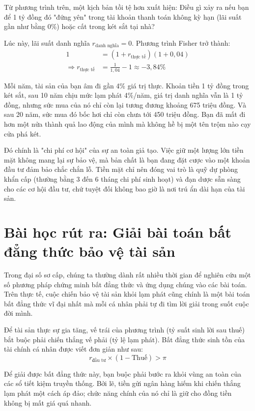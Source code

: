\documentclass[14pt, a4paper, oneside]{extreport}
\begin{document}
Từ phương trình trên, một kịch bản tồi tệ hơn xuất hiện: Điều gì xảy ra nếu bạn để 1 tỷ đồng đó "đứng yên" trong tài khoản thanh toán không kỳ hạn (lãi suất gần như bằng 0\%) hoặc cất trong két sắt tại nhà?

Lúc này, lãi suất danh nghĩa $r_{\text{danh nghĩa}} = 0$. Phương trình Fisher trở thành:
\begin{align*}
    1 &= (1 + r_{\text{thực tế}})(1 + 0,04) \\
    \Rightarrow r_{\text{thực tế}} &= \frac{1}{1,04} - 1 \approx -3,84\%
\end{align*}

Mỗi năm, tài sản của bạn âm đi gần 4\% giá trị thực. Khoản tiền 1 tỷ đồng trong két sắt, sau 10 năm chịu mức lạm phát 4\%/năm, giá trị danh nghĩa vẫn là 1 tỷ đồng, nhưng sức mua của nó chỉ còn lại tương đương khoảng 675 triệu đồng. Và sau 20 năm, sức mua đó bốc hơi chỉ còn chưa tới 450 triệu đồng. Bạn đã mất đi hơn một nửa thành quả lao động của mình mà không hề bị một tên trộm nào cạy cửa phá két.

Đó chính là "chi phí cơ hội" của sự an toàn giả tạo. Việc giữ một lượng lớn tiền mặt không mang lại sự bảo vệ, mà bản chất là bạn đang đặt cược vào một khoản đầu tư đảm bảo chắc chắn lỗ. Tiền mặt chỉ nên đóng vai trò là quỹ dự phòng khẩn cấp (thường bằng 3 đến 6 tháng chi phí sinh hoạt) và đạn dược sẵn sàng cho các cơ hội đầu tư, chứ tuyệt đối không bao giờ là nơi trú ẩn dài hạn của tài sản.

\section{Bài học rút ra: Giải bài toán bất đẳng thức bảo vệ tài sản}

Trong đại số sơ cấp, chúng ta thường dành rất nhiều thời gian để nghiên cứu một số phương pháp chứng minh bất đẳng thức và ứng dụng chúng vào các bài toán. Trên thực tế, cuộc chiến bảo vệ tài sản khỏi lạm phát cũng chính là một bài toán bất đẳng thức vĩ đại nhất mà mỗi cá nhân phải tự đi tìm lời giải trong suốt cuộc đời mình.

Để tài sản thực sự gia tăng, vế trái của phương trình (tỷ suất sinh lời sau thuế) bắt buộc phải chiến thắng vế phải (tỷ lệ lạm phát). Bất đẳng thức sinh tồn của tài chính cá nhân được viết đơn giản như sau:
\begin{equation}
    r_{\text{đầu tư}} \times (1 - \text{Thuế}) > \pi
\end{equation}

Để giải được bất đẳng thức này, bạn buộc phải bước ra khỏi vùng an toàn của các sổ tiết kiệm truyền thống. Bởi lẽ, tiền gửi ngân hàng hiếm khi chiến thắng lạm phát một cách áp đảo; chức năng chính của nó chỉ là giữ cho đồng tiền không bị mất giá quá nhanh. 
\end{document}
